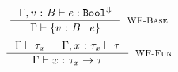 \hfill{\fbox{\iswellformed{\env}{\typ}}}\\

$$
\inference{
  \hastype{\env,\tbind{v}{\btyp}}{\refa}{\tbool^{\tlabel}}
}{
	\iswellformed{\env}{\tref{v}{\btyp}{\refa}}
}[\rwbase]
$$
$$
\inference{
	\iswellformed{\env}{\typ_x} &
	\iswellformed{\env,\tbind{x}{\typ_x}}{\typ}
}{
	\iswellformed{\env}{\tfun{x}{\typ_x}{\typ}}
}[\rwfun]
$$
